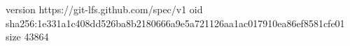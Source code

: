 version https://git-lfs.github.com/spec/v1
oid sha256:1e331a1c408dd526ba8b2180666a9e5a721126aa1ac017910ea86ef8581cfe01
size 43864
